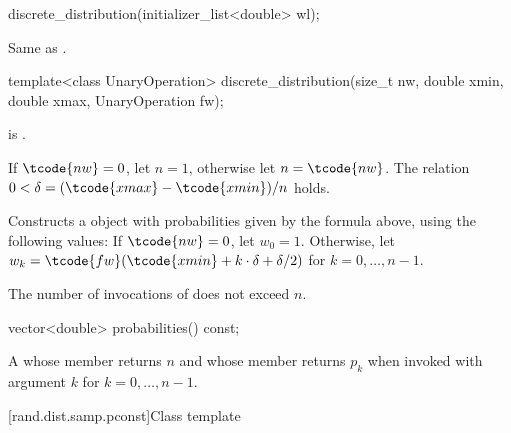 %
\begin{itemdecl}
discrete_distribution(initializer_list<double> wl);
\end{itemdecl}

\begin{itemdescr}
\pnum
\effects
 Same as .
\end{itemdescr}

\begin{itemdecl}
template<class UnaryOperation>
  discrete_distribution(size_t nw, double xmin, double xmax, UnaryOperation fw);
\end{itemdecl}

\begin{itemdescr}
\pnum
\mandates
{} is .

\pnum
\expects
 If $\tcode{nw} = 0$, let $n = 1$, otherwise let $n = \tcode{nw}$.
 The relation
   $0 < \delta = (\tcode{xmax} - \tcode{xmin}) / n$
 holds.

\pnum
\effects
Constructs a  object
 with probabilities given by the formula above,
 using the following values:
 If $\tcode{nw} = 0$,
 let $w_0 = 1$.
 Otherwise,
 let $w_k = \tcode{fw}(\tcode{xmin} + k \cdot \delta + \delta / 2)$
 for $k = 0, \dotsc, n - 1$.

\pnum
\complexity
The number of invocations of  does not exceed $n$.
\end{itemdescr}

%
\begin{itemdecl}
vector<double> probabilities() const;
\end{itemdecl}

\begin{itemdescr}
\pnum
\returns
A 
 whose  member returns $n$
 and whose  member returns $p_k$
 when invoked with argument $k$ for $k = 0, \dotsc, n - 1$.
\end{itemdescr}



[rand.dist.samp.pconst]{Class template }%
%
%


